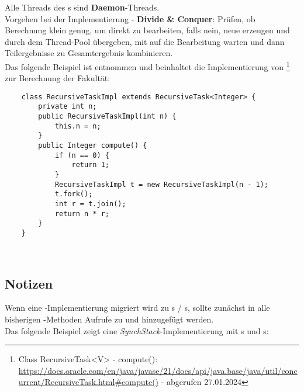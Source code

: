 \noindent
Alle Threads des s sind \textbf{Daemon}-Threads.\\

\noindent
Vorgehen bei der Implementierung - \textbf{Divide \& Conquer}: Prüfen, ob Berechnung klein genug, um direkt zu bearbeiten, falls nein, neue  erzeugen und durch  dem Thread-Pool übergeben, mit  auf die Bearbeitung warten und dann Teilergebnisse zu Gesamtergebnis kombinieren.\\

\noindent
Das folgende Beispiel ist \cite[168, Listing 3.25]{Oec22} entnommen und beinhaltet die Implementierung von \footnote{
    Class RecursiveTask<V> - compute(): \url{https://docs.oracle.com/en/java/javase/21/docs/api/java.base/java/util/concurrent/RecursiveTask.html#compute()} - abgerufen 27.01.2024
} zur Berechnung der Fakultät:
\begin{verbatim}
    class RecursiveTaskImpl extends RecursiveTask<Integer> {
        private int n;
        public RecursiveTaskImpl(int n) {
            this.n = n;
        }
        public Integer compute() {
            if (n == 0) {
                return 1;
            }
            RecursiveTaskImpl t = new RecursiveTaskImpl(n - 1);
            t.fork();
            int r = t.join();
            return n * r;
        }
    }
\end{verbatim}\\


\subsection{Notizen}
Wenn eine -Implementierung migriert wird zu s / s, sollte zunächst in alle bisherigen -Methoden Aufrufe zu  und  hinzugefügt werden.\\

\noindent
Das folgende Beispiel zeigt eine \textit{SynchStack}-Implementierung mit s und s:

